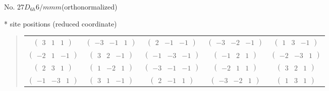 \documentclass[fleqn,9pt,landscape]{jsarticle}
\begin{document}
\newpage
\begin{center}
\LARGE
No. 27\quad$D_{6h}$\quad$6/mmm$\quad[ hexagonal ] (orthonormalized)
\end{center}
\vspace{5mm}
* site positions (reduced coordinate)
\begin{quote}
\begin{tabular}{ccccc}
$ \begin{pmatrix} 3 & 1 & 1 \end{pmatrix} $ & $ \begin{pmatrix} -3 & -1 & 1 \end{pmatrix} $ & $ \begin{pmatrix} 2 & -1 & -1 \end{pmatrix} $ & $ \begin{pmatrix} -3 & -2 & -1 \end{pmatrix} $ & $ \begin{pmatrix} 1 & 3 & -1 \end{pmatrix} $ \\
$ \begin{pmatrix} -2 & 1 & -1 \end{pmatrix} $ & $ \begin{pmatrix} 3 & 2 & -1 \end{pmatrix} $ & $ \begin{pmatrix} -1 & -3 & -1 \end{pmatrix} $ & $ \begin{pmatrix} -1 & 2 & 1 \end{pmatrix} $ & $ \begin{pmatrix} -2 & -3 & 1 \end{pmatrix} $ \\
$ \begin{pmatrix} 2 & 3 & 1 \end{pmatrix} $ & $ \begin{pmatrix} 1 & -2 & 1 \end{pmatrix} $ & $ \begin{pmatrix} -3 & -1 & -1 \end{pmatrix} $ & $ \begin{pmatrix} -2 & 1 & 1 \end{pmatrix} $ & $ \begin{pmatrix} 3 & 2 & 1 \end{pmatrix} $ \\
$ \begin{pmatrix} -1 & -3 & 1 \end{pmatrix} $ & $ \begin{pmatrix} 3 & 1 & -1 \end{pmatrix} $ & $ \begin{pmatrix} 2 & -1 & 1 \end{pmatrix} $ & $ \begin{pmatrix} -3 & -2 & 1 \end{pmatrix} $ & $ \begin{pmatrix} 1 & 3 & 1 \end{pmatrix} $ \\

\end{tabular}
\end{quote}
\end{document}
